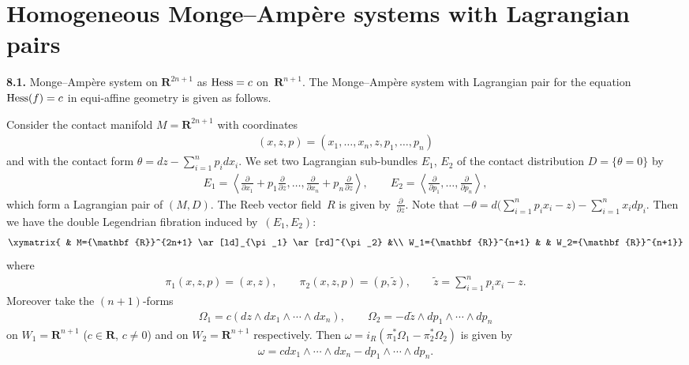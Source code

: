 \documentclass[pdftex]{sigma}
\begin{document}
\section{Homogeneous Monge--Amp{\`e}re systems with Lagrangian pairs}
\label{Homogeneous M-A systems with Lagrangian pairs.}

{\bf 8.1.}
Monge--Amp{\`e}re system on ${\mathbf{R}}^{2n+1}$ as
${\rm Hess} = c$ on~${\mathbf{R}}^{n+1}$.
The Monge--Amp{\`e}re system with Lagrangian pair
for the equation ${\rm Hess}(f)= c$
in equi-af\/f\/ine geometry is given as follows.

Consider the contact manifold
$M = {\mathbf{R}}^{2n+1}$ with coordinates
\begin{gather*}
(x, z, p) = (x_1, \dots, x_n, z, p_1, \dots, p_n)
\end{gather*}
and with the contact form
$\theta = dz - \sum\limits_{i=1}^n p_idx_i$.
We set two Lagrangian sub-bundles $E_1$, $E_2$
of the contact distribution $D=\{ \theta =0 \}$ by
\begin{gather*}
E_1  =
\left\langle \frac{\partial}{\partial x_1}+p_1\frac{\partial}{\partial z},
\dots,\frac{\partial}{\partial x_n}+p_n\frac{\partial}{\partial z}\right\rangle,
\qquad
E_2 =
\left\langle \frac{\partial}{\partial p_1},\dots,\frac{\partial}{\partial p_n}
\right\rangle,
\end{gather*}
which form a Lagrangian pair of $(M, D)$.
The Reeb vector f\/ield~$R$ is given by~$\frac{\partial}{\partial z}$.
Note that
$
- \theta = d\Big(\sum\limits_{i=1}^n p_ix_i - z\Big) - \sum\limits_{i=1}^n x_idp_i.
$
Then we have the double Legendrian f\/ibration induced by~$(E_1,E_2)$:
\begin{gather*}
\xymatrix{
& M={\mathbf{R}}^{2n+1} \ar[ld]_{\pi_1} \ar[rd]^{\pi_2}  &\\
W_1={\mathbf{R}}^{n+1} &  & W_2={\mathbf{R}}^{n+1}}
\end{gather*}
where
\begin{gather*}
\pi_1(x, z, p) = (x, z), \qquad
\pi_2(x, z, p) =
(p, \tilde{z}), \qquad \tilde{z} = \sum_{i=1}^n p_ix_i - z.
\end{gather*}
Moreover take the
$(n+1)$-forms
\begin{gather*}
\Omega_1
= c(dz \wedge dx_1\wedge \cdots \wedge dx_{n}),\qquad
\Omega_2
= - d\tilde{z} \wedge dp_1\wedge \cdots \wedge dp_{n}
\end{gather*}
on $W_1 = {\mathbf{R}}^{n+1}$
($c\in {\mathbf{R}}$, $c\not= 0$)
and
on $W_2 = {\mathbf{R}}^{n+1}$ respectively.
Then $\omega = i_R (\pi_1^*\Omega_1 - \pi_2^*\Omega_2)$
is given by
\begin{gather*}
\omega = c dx_1\wedge \cdots \wedge dx_{n} -
dp_1\wedge \cdots \wedge dp_{n}.
\end{gather*}
\end{document}
